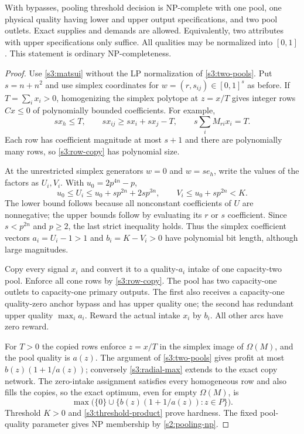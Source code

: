 \begin{theorem}\label{s3:base-bypass}
With bypasses, pooling threshold decision is NP-complete with one pool,
one physical quality having lower and upper output specifications, and
two pool outlets. Exact supplies and demands are allowed. Equivalently,
two attributes with upper specifications only suffice. All qualities may
be normalized into $[0,1]$. This statement is ordinary NP-completeness.
\end{theorem}
\begin{proof}
Use \cref{s3:matsui} without the LP normalization of
\cref{s3:two-pools}. Put $s=n+n^2$ and use simplex coordinates for
$w=(r,s_{ij})\in[0,1]^s$ as before. If $T=\sum_i x_i>0$, homogenizing
the simplex polytope at $z=x/T$ gives integer rows $Cx\le0$ of
polynomially bounded coefficients. For example,
\[
 sx_h\le T,\qquad sx_{ij}\ge sx_i+sx_j-T,
 \qquad s\sum_i M_{ri}x_i=T.
\]
Each row has coefficient magnitude at most $s+1$ and there are
polynomially many rows, so \cref{s3:row-copy} has polynomial size.

At the unrestricted simplex generators $w=0$ and $w=se_h$, write the
values of the factors as $U_i,V_i$. With $u_0=2p^{4n}-p$,
\begin{equation}
 u_0\le U_i\le u_0+sp^{2n}+2sp^{3n},\qquad
 V_i\le u_0+sp^{2n}<K.\label{s3:generator-bounds}
\end{equation}
The lower bound follows because all nonconstant coefficients of $U$
are nonnegative; the upper bounds follow by evaluating its $r$ or $s$
coefficient. Since $s<p^{2n}$ and $p\ge2$, the last strict inequality
holds. Thus the simplex coefficient vectors
$a_i=U_i-1>1$ and $b_i=K-V_i>0$ have polynomial bit length, although
large magnitudes.

Copy every signal $x_i$ and convert it to a quality-$a_i$ intake of
one capacity-two pool. Enforce all cone rows by \cref{s3:row-copy}.
The pool has two capacity-one outlets to capacity-one primary outputs.
The first also receives a capacity-one quality-zero anchor bypass and
has upper quality one; the second has redundant upper quality
$\max_i a_i$. Reward the actual intake $x_i$ by $b_i$. All other
arcs have zero reward.

For $T>0$ the copied rows enforce $z=x/T$ in the simplex image of
$\Omega(M)$, and the pool quality is $a(z)$. The argument of
\cref{s3:two-pools} gives profit at most $b(z)(1+1/a(z))$; conversely
\eqref{s3:radial-max} extends to the exact copy network. The zero-intake
assignment satisfies every homogeneous row and also fills the copies,
so the exact optimum, even for empty $\Omega(M)$, is
\begin{equation}
 \max\bigl(\{0\}\cup
 \{b(z)(1+1/a(z)):z\in P\}\bigr).\label{s3:copy-value}
\end{equation}
Threshold $K>0$ and \eqref{s3:threshold-product} prove hardness.
The fixed pool-quality parameter gives NP membership by
\cref{s2:pooling-np}.


\end{proof}

